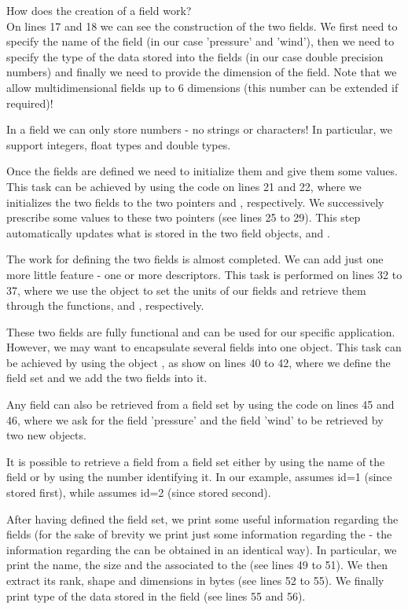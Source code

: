 How does the creation of a field work?\\
On lines 17 and 18 we can see the construction of the two fields.
We first need to specify the name of the field (in our case 'pressure' 
and 'wind'), then we need to specify the type of the data stored 
into the fields (in our case double precision numbers) and finally 
we need to provide the dimension of the field.
Note that we allow multidimensional fields up to 6 dimensions 
(this number can be extended if required)!
%
\begin{tipbox}
In a field we can only store numbers - no strings or characters!
In particular, we support integers, float types and double types.
\end{tipbox}
%
Once the fields are defined we need to initialize them 
and give them some values. This task can be achieved 
by using the code on lines 21 and 22, where we initializes 
the two fields to the two pointers  and 
, respectively. 
We successively prescribe some values to these two pointers 
(see lines 25 to 29). This step automatically updates what 
is stored in the two field objects,  
and .

The work for defining the two fields is almost completed.
We can add just one more little feature - one or more 
descriptors. This task is performed on lines 32 to 37, 
where we use the  object to set the units 
of our fields and retrieve them through the functions, 
 and , respectively.

These two fields are fully functional and can be used 
for our specific application. However, we may want to 
encapsulate several fields into one object. This task 
can be achieved by using the object , 
as show on lines 40 to 42, where we define the field 
set and we add the two fields into it.

Any field can also be retrieved from a field set by 
using the code on lines 45 and 46, where we ask for 
the field 'pressure' and the field 'wind' to be retrieved 
by two new  objects.
%
\begin{notebox}
It is possible to retrieve a field from a field set 
either by using the name of the field or by using 
the number identifying it. In our example,  
assumes id=1 (since stored first), while 
assumes id=2 (since stored second).
\end{notebox}
%
After having defined the field set, we print some 
useful information regarding the fields (for the sake of 
brevity we print just some information regarding the 
- the information regarding the  can 
be obtained in an identical way).
In particular, we print the name, the size and the 
associated to the  (see lines 49 to 51).
We then extract its rank, shape and dimensions in bytes
(see lines 52 to 55). We finally print type of the data
stored in the field (see lines 55 and 56).

